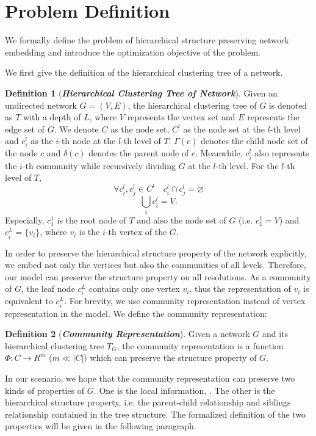 \documentclass{article}
\theoremstyle{definition}
\newtheorem{defn}{Definition}
\newcommand{\origin}[1]{{\color{blue}{#1}}}
\newcommand{\new}[1]{{\color{red}{#1}}}
\begin{document}
	\section{Problem Definition}
		We formally define the problem of hierarchical structure preserving network embedding and introduce the optimization objective of the problem. 
	
		We first give the definition of the hierarchical clustering tree \cite{clauset2008hierarchical} of a network.
		\begin{defn}[\textbf{\emph{Hierarchical Clustering Tree of Network}}]
			Given an undirected network $G = (V, E)$, the hierarchical clustering tree of $G$ is denoted as $T$ with a depth of $L$, where $V$ represents the vertex set and $E$ represents the edge set of $G$. We denote $C$ as the node set,
			$C^l$ as the node set at the $l$-th level and $c^l_i$ as the $i$-th node at the $l$-th level of $T$. $\Gamma(c)$ denotes the child node set of the node $c$ and $\delta(c)$ denotes the parent node of $c$. Meanwhile, $c^l_i$ also represents the $i$-th community while recursively dividing $G$ at the $l$-th level. For the $l$-th level of $T$,
				\[
				\forall c^l_i, c^l_j \in C^l \quad c^l_i \cap c^l_j = \varnothing
				\]
				\[
				\bigcup_i c_i^l = V.
				\]
			Especially, $c_1^1$ is the root node of $T$ and also the node set of $G$ (i.e. $c_1^1 = V$) and $c_i^L = \{v_i\}$, where $v_i$ is the $i$-th vertex of the $G$.
		\end{defn}
		
	 
		
		In order to preserve the hierarchical structure property of the network explicitly, we embed not only the vertices but also the communities of all levels. Therefore, our model can preserve the structure property on all resolutions. As a community of $G$, the leaf node $c_i^L$ contains only one vertex $v_i$, thus the representation of $v_i$ is equivalent to $c_i^L$. For brevity, we use community representation instead of vertex representation in the model. We define the community representation:
		\begin{defn}[\textbf{\emph{Community Representation}}]
			Given a network $G$ and its hierarchical clustering tree $T_G$, the community representation is a function $\Phi: C \rightarrow R^m$ ($m \ll |C|$) which can preserve the structure property of $G$.
		\end{defn} 
	    In our scenario, we hope that the community representation can preserve two kinds of properties of $G$. One is the local information, \new{ i.e. the pairwise proximity between sub-communities in the same community.} \origin{(i.e. the pairwise proximity between the child nodes deriving from the same parent node in $T$)}. The other is the hierarchical structure property, i.e. the parent-child relationship and siblings relationship contained in the tree structure. The formalized definition of the two properties will be given in the following paragraph. 
	    
\end{document}
